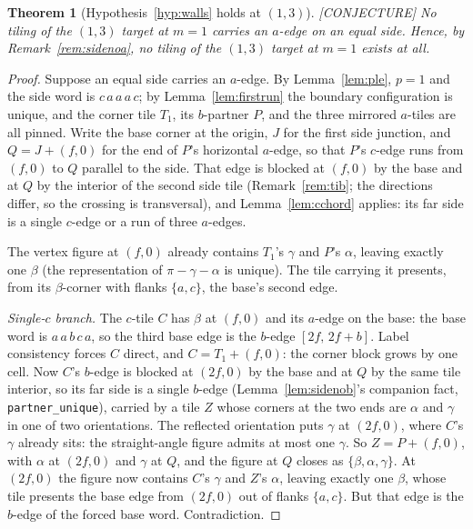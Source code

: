 \documentclass[11pt,reqno]{amsart}
\theoremstyle{plain}
\newtheorem{theorem}{Theorem}
\theoremstyle{definition}
\newcommand{\lab}[1]{\hfill\textnormal{\footnotesize\textsc{[#1]}}}
\begin{document}
\begin{theorem}[Hypothesis~\ref{hyp:walls} holds at $(1,3)$]\label{thm:walls13}\lab{CONJECTURE}
No tiling of the $(1,3)$ target at $m=1$ carries an $a$-edge on an equal side. Hence, by
Remark~\ref{rem:sidenoa}, no tiling of the $(1,3)$ target at $m=1$ exists at all.
\end{theorem}

\begin{proof}
Suppose an equal side carries an $a$-edge. By Lemma~\ref{lem:ple}, $p=1$ and the side word is
$c\,a\,a\,a\,c$; by Lemma~\ref{lem:firstrun} the boundary configuration is unique, and the corner
tile $T_1$, its $b$-partner $P$, and the three mirrored $a$-tiles are all pinned. Write the base
corner at the origin, $J$ for the first side junction, and $Q=J+(f,0)$ for the end of $P$'s
horizontal $a$-edge, so that $P$'s $c$-edge runs from $(f,0)$ to $Q$ parallel to the side. That
edge is blocked at $(f,0)$ by the base and at $Q$ by the interior of the second side tile
(Remark~\ref{rem:tib}; the directions differ, so the crossing is transversal), and
Lemma~\ref{lem:cchord} applies: its far side is a single $c$-edge or a run of three $a$-edges.

The vertex figure at $(f,0)$ already contains $T_1$'s $\gamma$ and $P$'s $\alpha$, leaving exactly
one $\beta$ (the representation of $\pi-\gamma-\alpha$ is unique). The tile carrying it presents,
from its $\beta$-corner with flanks $\{a,c\}$, the base's second edge.

\emph{Single-$c$ branch.} The $c$-tile $C$ has $\beta$ at $(f,0)$ and its $a$-edge on the base:
the base word is $a\,a\,b\,c\,a$, so the third base edge is the $b$-edge $[2f,\,2f+b]$. Label
consistency forces $C$ direct, and $C=T_1+(f,0)$: the corner block grows by one cell. Now $C$'s
$b$-edge is blocked at $(2f,0)$ by the base and at $Q$ by the same tile interior, so its far side
is a single $b$-edge (Lemma~\ref{lem:sidenob}'s companion fact, \texttt{partner\_unique}), carried
by a tile $Z$ whose corners at the two ends are $\alpha$ and $\gamma$ in one of two orientations.
The reflected orientation puts $\gamma$ at $(2f,0)$, where $C$'s $\gamma$ already sits: the
straight-angle figure admits at most one $\gamma$. So $Z=P+(f,0)$, with $\alpha$ at $(2f,0)$ and
$\gamma$ at $Q$, and the figure at $Q$ closes as $\{\beta,\alpha,\gamma\}$. At $(2f,0)$ the figure
now contains $C$'s $\gamma$ and $Z$'s $\alpha$, leaving exactly one $\beta$, whose tile presents
the base edge from $(2f,0)$ out of flanks $\{a,c\}$. But that edge is the $b$-edge of the forced
base word. Contradiction.


\end{proof}
\end{document}

